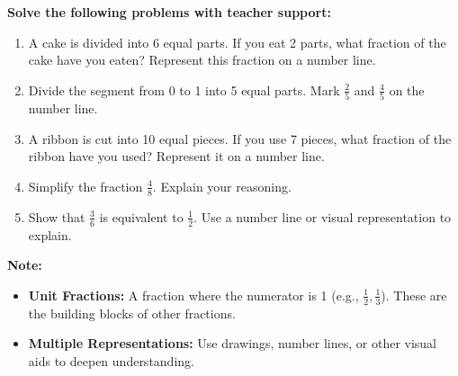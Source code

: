 \documentclass[12pt]{article}
\begin{document}
\begin{tcolorbox}[colframe=black!60, colback=white, 
coltitle=black, colbacktitle=black!15, fonttitle=\bfseries\Large, 
title=Guided Practice, halign title=center, left=10pt, right=10pt, top=10pt, bottom=150pt]
\textbf{Solve the following problems with teacher support:}
\begin{enumerate}[itemsep=5em] %
    \item A cake is divided into 6 equal parts. If you eat 2 parts, what fraction of the cake have you eaten? Represent this fraction on a number line.
    \item Divide the segment from 0 to 1 into 5 equal parts. Mark \( \frac{2}{5} \) and \( \frac{4}{5} \) on the number line.
    \item A ribbon is cut into 10 equal pieces. If you use 7 pieces, what fraction of the ribbon have you used? Represent it on a number line.
    \item Simplify the fraction \( \frac{4}{8} \). Explain your reasoning.
    \item Show that \( \frac{3}{6} \) is equivalent to \( \frac{1}{2} \). Use a number line or visual representation to explain.
\end{enumerate}
\end{tcolorbox}

\vspace{1em}

\begin{tcolorbox}[colframe=black!40, colback=gray!5, 
coltitle=black, colbacktitle=black!20, fonttitle=\bfseries\Large, 
title=Additional Notes, halign title=center, left=5pt, right=5pt, top=5pt, bottom=15pt]
\textbf{Note:}
\begin{itemize}
    \item \textbf{Unit Fractions:} A fraction where the numerator is 1 (e.g., \( \frac{1}{2}, \frac{1}{3} \)). These are the building blocks of other fractions.
    \item \textbf{Multiple Representations:} Use drawings, number lines, or other visual aids to deepen understanding.
\end{itemize}
\end{tcolorbox}

\vspace{1em}
\end{document}
